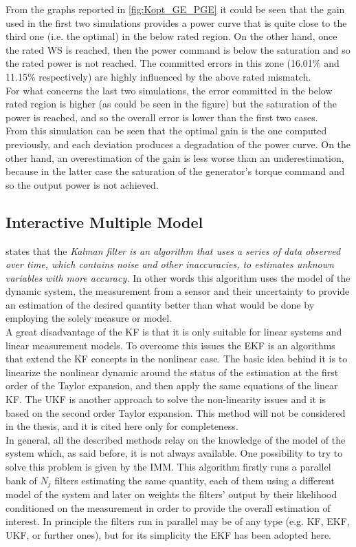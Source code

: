 From the graphs reported in \autoref{fig:Kopt_GE_PGE} it could be seen that the gain used in the first two simulations provides a power curve that is quite close to the third one (i.e. the optimal) in the below rated region. On the other hand, once the rated WS is reached, then the power command is below the saturation and so the rated power is not reached. The committed errors in this zone (16.01\% and 11.15\% respectively) are highly influenced by the above rated mismatch. \\
For what concerns the last two simulations, the error committed in the below rated region is higher (as could be seen in the figure) but the saturation of the power is reached, and so the overall error is lower than the first two cases. \\
From this simulation can be seen that the optimal gain is the one computed previously, and each deviation produces a degradation of the power curve. On the other hand, an overestimation of the gain is less worse than an underestimation, because in the latter case the saturation of the generator's torque command and so the output power is not achieved.

\subsection{Interactive Multiple Model}\label{subsec:IMM}
\cite{Kalman_Filter_and_Its_Application} states that the \textit{Kalman filter is an algorithm that uses a series of data observed over time, which contains noise and other inaccuracies, to estimates unknown variables with more accuracy.} In other words this algorithm uses the model of the dynamic system, the measurement from a sensor and their uncertainty to provide an estimation of the desired quantity better than what would be done by employing the solely measure or model.\\
 A great disadvantage of the \acrfull{KF} is that it is only suitable for linear systems and linear measurement models. To overcome this issues the \acrfull{EKF} is an algorithms that extend the KF concepts in the nonlinear case. The basic idea behind it is to linearize the nonlinear dynamic around the status of the estimation at the first order of the Taylor expansion, and then apply the same equations of the linear \acrshort{KF}. The \acrfull{UKF} is another approach to solve the non-linearity issues and it is based on the second order Taylor expansion. This method will not be considered in the thesis, and it is cited here only for completeness.\\
In general, all the described methods relay on the knowledge of the model of the system which, as said before, it is not always available. One possibility to try to solve this problem is given by the \acrshort{IMM}. This algorithm firstly runs a parallel bank of $N_j$ filters estimating the same quantity, each of them using a different model of the system and later on weights the filters' output by their likelihood conditioned on the measurement in order to provide the overall estimation of interest. In principle the filters run in parallel may be of any type (e.g. KF, EKF, UKF, or further ones), but for its simplicity the EKF has been adopted here. 


